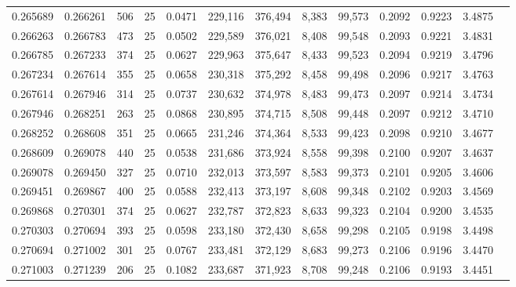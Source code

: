 \begin{tabular}{rrrrrrrrrrrrr}
0.265689 & 0.266261 &   506 &  25 &                                     0.0471 & 229,116 & 376,494 &   8,383 &  99,573 & 0.2092 & 0.9223 & 3.4875 \\
0.266263 & 0.266783 &   473 &  25 &                                     0.0502 & 229,589 & 376,021 &   8,408 &  99,548 & 0.2093 & 0.9221 & 3.4831 \\
0.266785 & 0.267233 &   374 &  25 &                                     0.0627 & 229,963 & 375,647 &   8,433 &  99,523 & 0.2094 & 0.9219 & 3.4796 \\
0.267234 & 0.267614 &   355 &  25 &                                     0.0658 & 230,318 & 375,292 &   8,458 &  99,498 & 0.2096 & 0.9217 & 3.4763 \\
0.267614 & 0.267946 &   314 &  25 &                                     0.0737 & 230,632 & 374,978 &   8,483 &  99,473 & 0.2097 & 0.9214 & 3.4734 \\
0.267946 & 0.268251 &   263 &  25 &                                     0.0868 & 230,895 & 374,715 &   8,508 &  99,448 & 0.2097 & 0.9212 & 3.4710 \\
0.268252 & 0.268608 &   351 &  25 &                                     0.0665 & 231,246 & 374,364 &   8,533 &  99,423 & 0.2098 & 0.9210 & 3.4677 \\
0.268609 & 0.269078 &   440 &  25 &                                     0.0538 & 231,686 & 373,924 &   8,558 &  99,398 & 0.2100 & 0.9207 & 3.4637 \\
0.269078 & 0.269450 &   327 &  25 &                                     0.0710 & 232,013 & 373,597 &   8,583 &  99,373 & 0.2101 & 0.9205 & 3.4606 \\
0.269451 & 0.269867 &   400 &  25 &                                     0.0588 & 232,413 & 373,197 &   8,608 &  99,348 & 0.2102 & 0.9203 & 3.4569 \\
0.269868 & 0.270301 &   374 &  25 &                                     0.0627 & 232,787 & 372,823 &   8,633 &  99,323 & 0.2104 & 0.9200 & 3.4535 \\
0.270303 & 0.270694 &   393 &  25 &                                     0.0598 & 233,180 & 372,430 &   8,658 &  99,298 & 0.2105 & 0.9198 & 3.4498 \\
0.270694 & 0.271002 &   301 &  25 &                                     0.0767 & 233,481 & 372,129 &   8,683 &  99,273 & 0.2106 & 0.9196 & 3.4470 \\
0.271003 & 0.271239 &   206 &  25 &                                     0.1082 & 233,687 & 371,923 &   8,708 &  99,248 & 0.2106 & 0.9193 & 3.4451 \\

\end{tabular}
